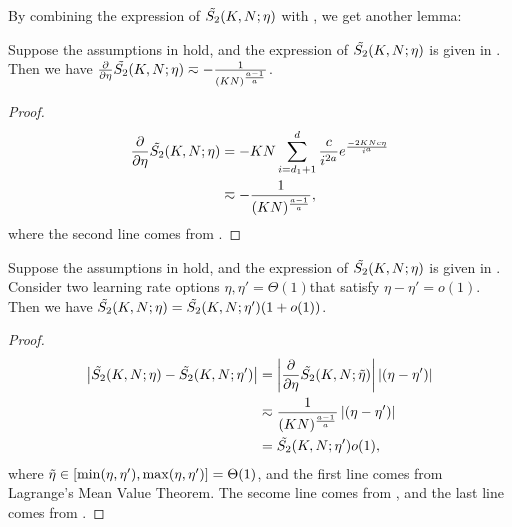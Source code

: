 By combining the expression of $\Tilde{S_2}(K, N; \eta)$ with , we get another lemma:
\begin{lemma} \label{lem:power-S_2-derivative}
    Suppose the assumptions in  hold, and the expression of $\Tilde{S_2}(K,N;\eta)$ is given in . Then we have $\frac{\partial}{\partial\eta}\Tilde{S_2}(K,N;\eta)\eqsim-\frac{1}{(KN)^{\frac{a-1}{a}}}$.
\end{lemma}
\begin{proof}
\begin{align*}
    \frac{\partial}{\partial\eta}\Tilde{S_2}(K,N;\eta)&=-KN\sum_{i=d_1+1}^{d}\frac{c}{i^{2a}}e^{\frac{-2KNc\eta}{i^{a}}} \\
    &\eqsim-\frac{1}{(KN)^{\frac{a-1}{a}}},
\end{align*}
where the second line comes from .
\end{proof}
\begin{lemma} \label{cor:one-hot-power-eta-approx}
 Suppose the assumptions in  hold, and the expression of $\Tilde{S_2}(K,N;\eta)$ is given in . Consider two learning rate options $\eta, \eta' = \Theta(1)$that satisfy $\eta-\eta'=o(1)$. Then we have $\Tilde{S_2}(K,N;\eta)=\Tilde{S_2}(K,N;\eta')(1+o(1))$.
\end{lemma}
\begin{proof}
    \begin{align*}
        \left|\Tilde{S_2}(K,N;\eta)-\Tilde{S_2}(K,N;\eta')\right|&=\left|\frac{\partial}{\partial\eta}\Tilde{S_2}(K,N;\Tilde{\eta})\right|\left|(\eta-\eta')\right| \\
        &\eqsim \frac{1}{(KN)^{\frac{a-1}{a}}}\left|(\eta-\eta')\right| \\
        &=\Tilde{S_2}(K,N;\eta')o(1),
    \end{align*}
    where $\Tilde{\eta}\in\left[\min(\eta, \eta'), \max(\eta,\eta')\right]=\Theta(1)$, and the first line comes from Lagrange's Mean Value Theorem. The secome line comes from , and the last line comes from .
\end{proof}

